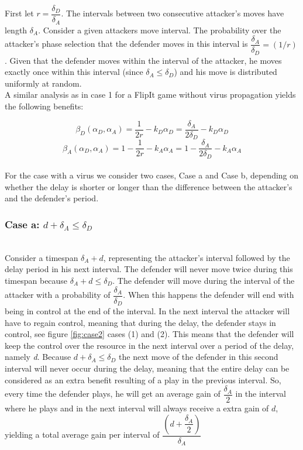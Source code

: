 \documentclass[master=cws, masteroption=vs,english]{kulemt}
\begin{document}
\begin{abstract*}
First let $r = \dfrac{\delta_{D}}{ \delta_{A} }$. The intervals between two consecutive attacker's moves have length $\delta_{A}$. Consider a given attackers move interval. The probability over the attacker's phase selection that the defender moves in this interval is $\dfrac{\delta_{A}}{ \delta_{D} } = (1/r)$. Given that the defender moves within the interval of the attacker, he moves exactly once within this interval (since $\delta_{A} \leq \delta_{D} $) and his move is distributed uniformly at random. \\

A similar analysis as in case 1 for a FlipIt game without virus propagation yields the following benefits:

\begin{equation}\label{first}
\beta_{D}(\alpha_{D},\alpha_{A}) = \dfrac {1} {2r} - k_{D} \alpha_{D} = \dfrac {\delta_{A}} {2\delta_{D}} - k_{D} \alpha_{D} 
\end{equation}
\begin{equation}\label{first}
\beta_{A}(\alpha_{D},\alpha_{A}) =1 - \dfrac {1} {2r} - k_{A} \alpha_{A} = 1- \dfrac {\delta_{A}} {2\delta_{D}} - k_{A} \alpha_{A}  
\end{equation}\\


For the case with a virus we consider two cases, Case a and Case b, depending on whether the delay is shorter or longer than the difference between the attacker's and the defender's period.  \\


\subsubsection*{\textbf{Case a:} $d + \delta_{A} \leq \delta_{D}$}
~~\\
Consider a timespan $\delta_{A} + d$, representing the attacker's interval followed by the delay period in his next interval. The defender will never move twice during this timespan because $\delta_{A} + d \leq \delta_{D}$. The defender will move during the interval of the attacker with a probability of $\dfrac{\delta_{A}}{\delta_{D}} $. When this happens the defender will end with being in control at the end of the interval. In the next interval the attacker will have to regain control, meaning that during the delay, the defender stays in control, see figure \ref{fig:case2} cases (1) and (2). This means that the defender will keep the control over the resource in the next interval over a period of the delay, namely \textit{d}. Because $d + \delta_{A} \leq \delta_{D}$ the next move of the defender in this second interval will never occur during the delay, meaning that the entire delay can be considered as an extra benefit resulting of a play in the previous interval. 
So, every time the defender plays, he will get an average gain of $\dfrac{\delta_{A}}{2}$ in the interval where he plays and in the next interval will always receive a extra gain of $d$, yielding a total average gain per interval of
$\dfrac{(d+\dfrac{\delta_{A}}{2})}{\delta_{A}}$


\end{abstract*}
\end{document}
